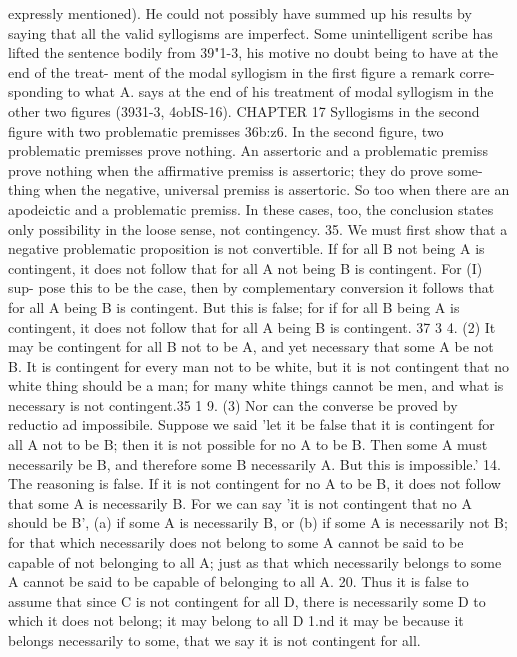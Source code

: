 {{{{{{{{expressly mentioned). He could not possibly have summed up
his results by saying that all the valid syllogisms are imperfect.
Some unintelligent scribe has lifted the sentence bodily from
39"1-3, his motive no doubt being to have at the end of the treat-
ment of the modal syllogism in the first figure a remark corre-
sponding to what A. says at the end of his treatment of modal
syllogism in the other two figures (3931-3, 4obIS-16).
CHAPTER 17
Syllogisms in the second figure with two problematic premisses
36b:z6. In the second figure, two problematic premisses prove
nothing. An assertoric and a problematic premiss prove nothing
when the affirmative premiss is assertoric; they do prove some-
thing when the negative, universal premiss is assertoric. So too
when there are an apodeictic and a problematic premiss. In these
cases, too, the conclusion states only possibility in the loose sense,
not contingency.
35. We must first show that a negative problematic proposition
is not convertible. If for all B not being A is contingent, it does
not follow that for all A not being B is contingent. For (I) sup-
pose this to be the case, then by complementary conversion it
follows that for all A being B is contingent. But this is false; for
if for all B being A is contingent, it does not follow that for all A
being B is contingent.
37 3 4. (2) It may be contingent for all B not to be A, and yet
necessary that some A be not B. It is contingent for every man
not to be white, but it is not contingent that no white thing should
be a man; for many white things cannot be men, and what is
necessary is not contingent.35 1
9. (3) Nor can the converse be proved by reductio ad impossibile.
Suppose we said 'let it be false that it is contingent for all A not
to be B; then it is not possible for no A to be B. Then some A
must necessarily be B, and therefore some B necessarily A. But
this is impossible.'
14. The reasoning is false. If it is not contingent for no A to
be B, it does not follow that some A is necessarily B. For we can
say 'it is not contingent that no A should be B', (a) if some A is
necessarily B, or (b) if some A is necessarily not B; for that which
necessarily does not belong to some A cannot be said to be
capable of not belonging to all A; just as that which necessarily
belongs to some A cannot be said to be capable of belonging to
all A.
20. Thus it is false to assume that since C is not contingent
for all D, there is necessarily some D to which it does not
belong; it may belong to all D 1.nd it may be because it
belongs necessarily to some, that we say it is not contingent for all.
}}}}}}}}
